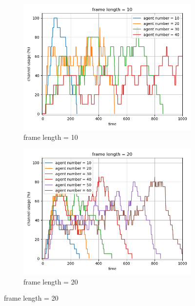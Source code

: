 \begin{figure}[htbp]
    \centering
    \begin{subfigure}[t]{0.45\linewidth}
        \centering
        \includegraphics[width=\linewidth]{figures/channel_usage_frame10.png}
        \caption{frame length = 10}
        \label{fig:framepercent1}
    \end{subfigure}
    \hfill
    \begin{subfigure}[t]{0.45\linewidth}
        \centering
        \includegraphics[width=\linewidth]{figures/channel_usage_frame20.png}
        \caption{frame length = 20}
        \label{fig:framepercent2}
    \end{subfigure}
    

\end{figure}

